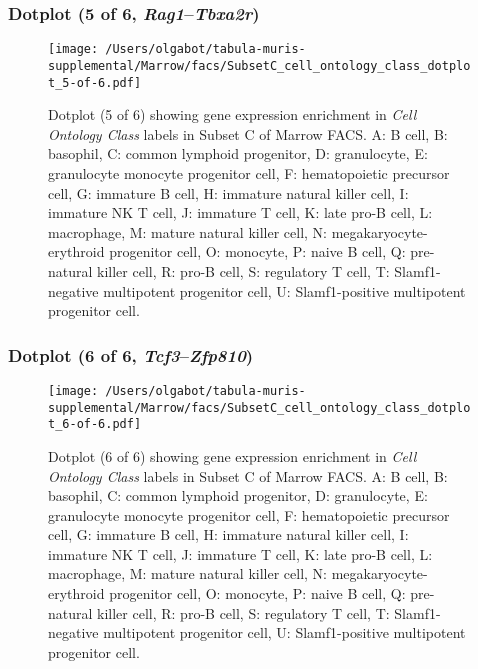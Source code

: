 \subsubsection{Dotplot (5 of 6, \emph{Rag1}--\emph{Tbxa2r})}
\begin{figure}[h]
\centering
\texttt{[image: /Users/olgabot/tabula-muris-supplemental/Marrow/facs/SubsetC\_cell\_ontology\_class\_dotplot\_5-of-6.pdf]}

\caption{ Dotplot (5 of 6)  showing gene expression enrichment in \emph{Cell Ontology Class} labels in Subset C of Marrow FACS. A: B cell, B: basophil, C: common lymphoid progenitor, D: granulocyte, E: granulocyte monocyte progenitor cell, F: hematopoietic precursor cell, G: immature B cell, H: immature natural killer cell, I: immature NK T cell, J: immature T cell, K: late pro-B cell, L: macrophage, M: mature natural killer cell, N: megakaryocyte-erythroid progenitor cell, O: monocyte, P: naive B cell, Q: pre-natural killer cell, R: pro-B cell, S: regulatory T cell, T: Slamf1-negative multipotent progenitor cell, U: Slamf1-positive multipotent progenitor cell.}
\end{figure}


\clearpage

\subsubsection{Dotplot (6 of 6, \emph{Tcf3}--\emph{Zfp810})}
\begin{figure}[h]
\centering
\texttt{[image: /Users/olgabot/tabula-muris-supplemental/Marrow/facs/SubsetC\_cell\_ontology\_class\_dotplot\_6-of-6.pdf]}

\caption{ Dotplot (6 of 6)  showing gene expression enrichment in \emph{Cell Ontology Class} labels in Subset C of Marrow FACS. A: B cell, B: basophil, C: common lymphoid progenitor, D: granulocyte, E: granulocyte monocyte progenitor cell, F: hematopoietic precursor cell, G: immature B cell, H: immature natural killer cell, I: immature NK T cell, J: immature T cell, K: late pro-B cell, L: macrophage, M: mature natural killer cell, N: megakaryocyte-erythroid progenitor cell, O: monocyte, P: naive B cell, Q: pre-natural killer cell, R: pro-B cell, S: regulatory T cell, T: Slamf1-negative multipotent progenitor cell, U: Slamf1-positive multipotent progenitor cell.}
\end{figure}


\clearpage

